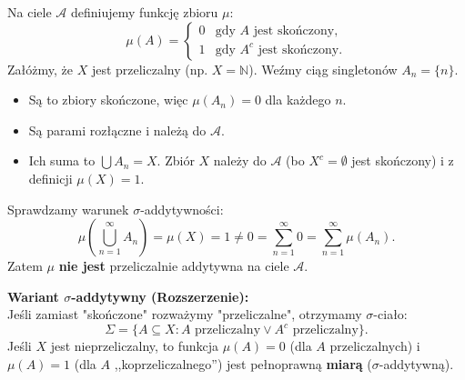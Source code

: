 \begin{remark}	
 Na ciele $\mathcal{A}$ definiujemy funkcję zbioru $\mu$:
    \[
        \mu(A) = \begin{cases} 
            0 & \text{gdy } A \text{ jest skończony}, \\
            1 & \text{gdy } A^c \text{ jest skończony}.
        \end{cases}
\]
    Załóżmy, że $X$ jest przeliczalny (np. $X = \mathbb{N}$).
    Weźmy ciąg singletonów $A_n = \{n\}$.
    \begin{itemize}
        \item Są to zbiory skończone, więc $\mu(A_n) = 0$ dla każdego $n$.
        \item Są parami rozłączne i należą do $\mathcal{A}$.
        \item Ich suma to $\bigcup A_n = X$. Zbiór $X$ należy do $\mathcal{A}$ (bo $X^c = \emptyset$ jest skończony) i z definicji $\mu(X) = 1$.
    \end{itemize}
    Sprawdzamy warunek $\sigma$-addytywności:
    \[
        \mu\left( \bigcup_{n=1}^\infty A_n \right) = \mu(X) = 1 \neq 0 = \sum_{n=1}^\infty 0 = \sum_{n=1}^\infty \mu(A_n).
   \]
    Zatem $\mu$ \textbf{nie jest} przeliczalnie addytywna na ciele $\mathcal{A}$.

    \textbf{Wariant $\sigma$-addytywny (Rozszerzenie):} \\
    Jeśli zamiast "skończone" rozważymy "przeliczalne", otrzymamy $\sigma$-ciało:
    \[
        \Sigma = \{ A \subseteq X : A \text{ przeliczalny} \lor A^c \text{ przeliczalny} \}.
    \]
    Jeśli $X$ jest nieprzeliczalny, to funkcja $\mu(A)=0$ (dla $A$ przeliczalnych) i $\mu(A)=1$ (dla $A$ ,,koprzeliczalnego'') jest pełnoprawną \textbf{miarą} ($\sigma$-addytywną).
\end{remark} 

